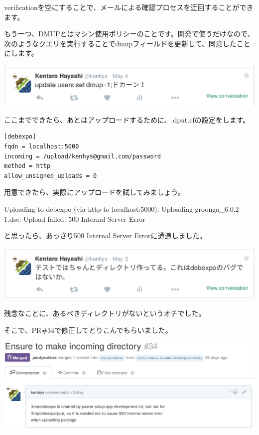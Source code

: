 \documentclass[mingoth,a4paper]{jsarticle}
\begin{document}
verificationを空にすることで、メールによる確認プロセスを迂回することができます。

もう一つ、DMUPとはマシン使用ポリシーのことです。開発で使うだけなので、次のようなクエリを実行することでdmupフィールドを更新して、同意したことにします。

\begin{screen}
\includegraphics[width=0.7\hsize]{image201606/update-dmup.eps}
\end{screen}


ここまでできたら、あとはアップロードするために、.dput.cfの設定をします。

\begin{screen}
\begin{verbatim}
[debexpo]
fqdn = localhost:5000
incoming = /upload/kenhys@gmail.com/password
method = http
allow_unsigned_uploads = 0
\end{verbatim}
\end{screen}

用意できたら、実際にアップロードを試してみましょう。

\begin{commandline}
Uploading to debexpo (via http to localhost:5000):
Uploading groonga_6.0.2-1.dsc:
Upload failed: 500 Internal Server Error
\end{commandline}

と思ったら、あっさり500 Internal Server Errorに遭遇しました。

\begin{screen}
\includegraphics[width=0.7\hsize]{image201606/find-a-debexpo-bug.eps}
\end{screen}

残念なことに、あるべきディレクトリがないというオチでした。

そこで、PR\#34で修正してとりこんでもらいました。

\begin{screen}
\includegraphics[width=0.7\hsize]{image201606/debexpo-pr34-incoming-directory.eps}
\end{screen}
\end{document}
